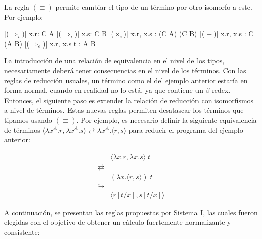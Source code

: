 La regla $(\equiv)$ permite cambiar el tipo de un término por otro isomorfo a este. Por ejemplo:

\begin{prooftree*}
	[($\Rightarrow_i$)]{ \Gamma\vdash \lambda x.r: C \rightarrow A }
	[($\Rightarrow_i$)]{ \Gamma\vdash \lambda x.s: C \rightarrow B }
	[($\times_i$)]{ \Gamma\vdash \langle \lambda x.r, \lambda x.s \rangle : (C \rightarrow A) \times (C \rightarrow B) }
	[($\equiv$)]{ \Gamma\vdash \langle \lambda x.r, \lambda x.s \rangle : C \rightarrow (A \times B) }
	[($\Rightarrow_e$)]{ \Gamma\vdash \langle \lambda x.r, \lambda x.s \rangle \; t : A \times B }
\end{prooftree*}

La introducción de una relación de equivalencia en el nivel de los tipos, necesariamente deberá tener consecuencias en el nivel de los términos.
Con las reglas de reducción usuales, un término como el del ejemplo anterior estaría en forma normal,  cuando en realidad no lo está, ya que contiene un $\beta$-redex.
Entonces, el siguiente paso es extender la relación de reducción con isomorfismos a nivel de términos.
Estas nuevas reglas permiten desatascar los términos que tipamos usando $(\equiv)$.
Por ejemplo, es necesario definir la siguiente equivalencia de términos $\langle \lambda x^A.r, \lambda x^A.s \rangle \rightleftarrows \lambda x^A. \langle r, s \rangle$ para reducir el programa del ejemplo anterior:

\begin{align*}
	& \langle \lambda x.r, \lambda x.s \rangle \; t \\
	\rightleftarrows& \\
	& (\lambda x. \langle r, s \rangle)\; t \\
	\hookrightarrow& \\
	& \langle r[t/x], s[t/x] \rangle
\end{align*}

A continuación, se presentan las reglas propuestas por Sistema I, las cuales fueron elegidas con el objetivo de obtener un cálculo fuertemente normalizante y consistente:

